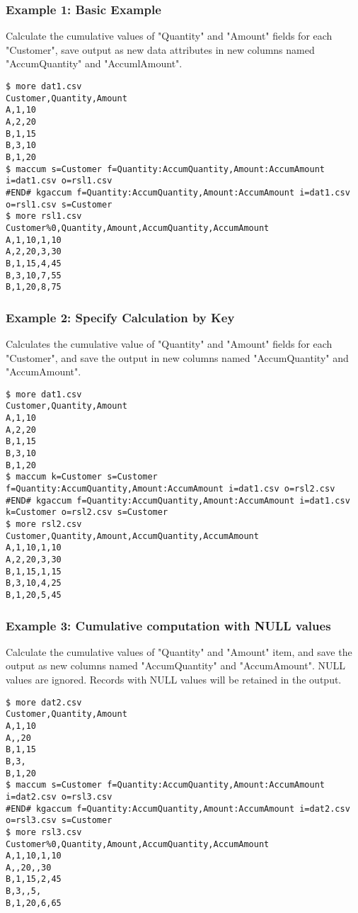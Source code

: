 \subsubsection*{Example 1: Basic Example}

Calculate the cumulative values ​​of "Quantity" and "Amount" fields for each "Customer", save output as new data attributes in new columns named "AccumQuantity" and "AccumlAmount".


\begin{Verbatim}[baselinestretch=0.7,frame=single]
$ more dat1.csv
Customer,Quantity,Amount
A,1,10
A,2,20
B,1,15
B,3,10
B,1,20
$ maccum s=Customer f=Quantity:AccumQuantity,Amount:AccumAmount i=dat1.csv o=rsl1.csv
#END# kgaccum f=Quantity:AccumQuantity,Amount:AccumAmount i=dat1.csv o=rsl1.csv s=Customer
$ more rsl1.csv
Customer%0,Quantity,Amount,AccumQuantity,AccumAmount
A,1,10,1,10
A,2,20,3,30
B,1,15,4,45
B,3,10,7,55
B,1,20,8,75
\end{Verbatim}
\subsubsection*{Example 2: Specify Calculation by Key}

Calculates the cumulative value of "Quantity" and "Amount" fields for each "Customer", and save the output in new columns named "AccumQuantity" and  "AccumAmount".


\begin{Verbatim}[baselinestretch=0.7,frame=single]
$ more dat1.csv
Customer,Quantity,Amount
A,1,10
A,2,20
B,1,15
B,3,10
B,1,20
$ maccum k=Customer s=Customer f=Quantity:AccumQuantity,Amount:AccumAmount i=dat1.csv o=rsl2.csv
#END# kgaccum f=Quantity:AccumQuantity,Amount:AccumAmount i=dat1.csv k=Customer o=rsl2.csv s=Customer
$ more rsl2.csv
Customer,Quantity,Amount,AccumQuantity,AccumAmount
A,1,10,1,10
A,2,20,3,30
B,1,15,1,15
B,3,10,4,25
B,1,20,5,45
\end{Verbatim}
\subsubsection*{Example 3: Cumulative computation with NULL values}

Calculate the cumulative values ​​of "Quantity" and "Amount" item, and save the output as new columns named "AccumQuantity" and "AccumAmount". NULL values are ignored. Records with NULL values will be retained in the output.


\begin{Verbatim}[baselinestretch=0.7,frame=single]
$ more dat2.csv
Customer,Quantity,Amount
A,1,10
A,,20
B,1,15
B,3,
B,1,20
$ maccum s=Customer f=Quantity:AccumQuantity,Amount:AccumAmount i=dat2.csv o=rsl3.csv
#END# kgaccum f=Quantity:AccumQuantity,Amount:AccumAmount i=dat2.csv o=rsl3.csv s=Customer
$ more rsl3.csv
Customer%0,Quantity,Amount,AccumQuantity,AccumAmount
A,1,10,1,10
A,,20,,30
B,1,15,2,45
B,3,,5,
B,1,20,6,65
\end{Verbatim}

